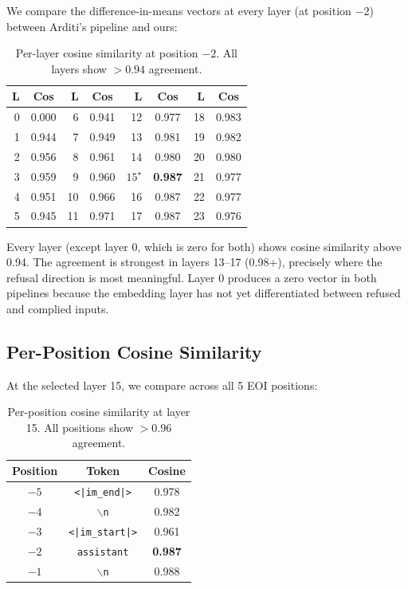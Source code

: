 \documentclass[11pt,a4paper]{article}
\begin{document}
We compare the difference-in-means vectors at every layer (at position $-2$) between Arditi's pipeline and ours:

\begin{table}[H]\centering
\caption{Per-layer cosine similarity at position $-2$. All layers show $>0.94$ agreement.}
\begin{tabular}{rc|rc|rc|rc}
\toprule
\textbf{L} & \textbf{Cos} & \textbf{L} & \textbf{Cos} & \textbf{L} & \textbf{Cos} & \textbf{L} & \textbf{Cos} \\
\midrule
 0 & 0.000 &  6 & 0.941 & 12 & 0.977 & 18 & 0.983 \\
 1 & 0.944 &  7 & 0.949 & 13 & 0.981 & 19 & 0.982 \\
 2 & 0.956 &  8 & 0.961 & 14 & 0.980 & 20 & 0.980 \\
 3 & 0.959 &  9 & 0.960 & $15^\star$ & \textbf{0.987} & 21 & 0.977 \\
 4 & 0.951 & 10 & 0.966 & 16 & 0.987 & 22 & 0.977 \\
 5 & 0.945 & 11 & 0.971 & 17 & 0.987 & 23 & 0.976 \\
\bottomrule
\end{tabular}
\end{table}

Every layer (except layer 0, which is zero for both) shows cosine similarity above 0.94. The agreement is strongest in layers 13--17 (0.98+), precisely where the refusal direction is most meaningful. Layer 0 produces a zero vector in both pipelines because the embedding layer has not yet differentiated between refused and complied inputs.

\subsection{Per-Position Cosine Similarity}

At the selected layer 15, we compare across all 5 EOI positions:

\begin{table}[H]\centering
\caption{Per-position cosine similarity at layer 15. All positions show $>0.96$ agreement.}
\begin{tabular}{ccc}
\toprule
\textbf{Position} & \textbf{Token} & \textbf{Cosine} \\
\midrule
$-5$ & \texttt{<|im\_end|>} & 0.978 \\
$-4$ & \texttt{$\backslash$n} & 0.982 \\
$-3$ & \texttt{<|im\_start|>} & 0.961 \\
$-2$ & \texttt{assistant} & \textbf{0.987} \\
$-1$ & \texttt{$\backslash$n} & 0.988 \\
\bottomrule
\end{tabular}
\end{table}
\end{document}
